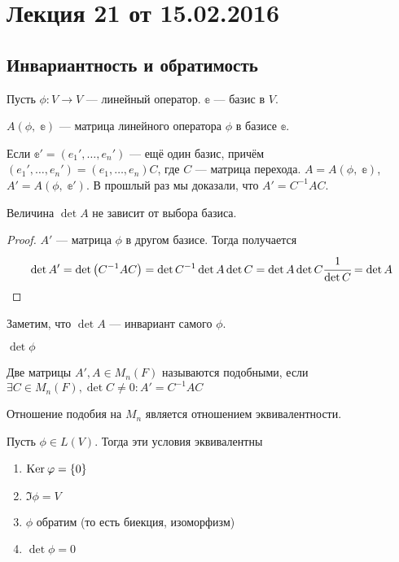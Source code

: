 



\section{Лекция 21 от 15.02.2016}

\subsection*{Инвариантность и обратимость}
Пусть $\phi\colon V \rightarrow V$ --- линейный оператор. $\mathbb{e}$ --- базис в $V$. 
\begin{Designation}
    $A(\phi,\;\mathbb{e})$ --- матрица линейного оператора $\phi$ в базисе $\mathbb{e}$.
\end{Designation}
Если $\mathbb{e}' = (e_1', \ldots, e_n')$ --- ещё один базис, причём $(e_1', \ldots, e_n') = (e_1, \ldots, e_n)C$, где $C$ --- матрица перехода. $A = A(\phi,\; \mathbb{e})$, $A' = A(\phi,\; \mathbb{e}')$.
В прошлый раз мы доказали, что $A' = C^{-1}AC$.
\begin{Consequence}
    Величина $\det A$ не зависит от выбора базиса. 
\end{Consequence}
\begin{proof}
    $A'$ --- матрица $\phi$ в другом базисе. Тогда получается
    \begin{gather*}
        \det A' = \det \left(C^{-1}AC\right) = \det C^{-1} \det A \det C = \det A \det C \cfrac{1}{\det C} = \det A
    \end{gather*}
\end{proof}
Заметим, что $\det A$ --- инвариант самого $\phi$. 
\begin{Designation}
    $\det\phi$
\end{Designation}
\begin{Def}
    Две матрицы $A', A \in M_n(F)$ называются подобными, если $\exists C \in M_n(F), \det C \neq 0\colon A' = C^{-1}AC$
\end{Def}
\begin{Comment}
    Отношение подобия на $M_n$ является отношением эквивалентности. 
\end{Comment}
\begin{Suggestion}
    Пусть $\phi \in L(V)$. Тогда эти условия эквивалентны
    \begin{enumerate}
        \item $\mathrm{Ker}\:\varphi = \{0\}$
        \item $\Im \phi = V$
        \item $\phi$ обратим (то есть биекция, изоморфизм)
        \item $\det \phi = 0$
    \end{enumerate}
\end{Suggestion}
